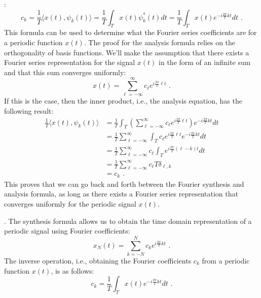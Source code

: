 :
\begin{equation}
\boxed{
c_k = \frac{1}{T}\langle x(t), \psi_k(t) \rangle = \frac{1}{T}\int_T x(t) \psi_k^*(t) dt = \frac{1}{T}\int_T x(t) e^{-i \frac{2\pi}{T} k t} dt
} \,\,.
\end{equation}
This formula can be used to determine what the Fourier series coefficients are for a periodic function $x(t)$. The proof for the analysis formula relies on the orthogonality of basis functions. We'll make the assumption that there exists a Fourier series representation for the signal $x(t)$ in the form of an infinite sum and that this sum converges uniformly:
\begin{equation}
x(t) = \sum_{\ell=-\infty}^{\infty} c_{\ell} e^{i\frac{2\pi}{T}\ell t} \,\,.
\end{equation}
If this is the case, then the inner product, i.e., the analysis
equation, has the following result:
\begin{align}
\frac{1}{T}\langle x(t), \psi_k(t) \rangle &= \frac{1}{T}\int_T \left(\sum_{\ell=-\infty}^{\infty} c_\ell e^{i\frac{2\pi}{T}\ell t}\right) e^{-i\frac{2\pi}{T}k t}dt\\
&=\frac{1}{T}\sum_{\ell=-\infty}^{\infty} \int_T c_{\ell} e^{i\frac{2\pi}{T}\ell t} e^{-i\frac{2\pi}{T}kt}dt \\
  &= \frac{1}{T}\sum_{\ell=-\infty}^{\infty}c_{\ell} \int_T e^{i\frac{2\pi}{T}(\ell-k)t}dt \\
  &= \frac{1}{T}\sum_{\ell=-\infty}^{\infty}c_{\ell} T \delta_{\ell,k}\\
  &= c_k \,\,.
\end{align}
This proves that we can go back and forth between the Fourier synthesis and analysis formula, as long as there exists a Fourier series representation that converges uniformly for the periodic signal $x(t)$.

. The synthesis formula allows us to obtain the time domain representation of a periodic signal using Fourier coefficients:
\begin{equation}
\boxed{
x_N(t) = \sum_{k=-N}^{N} c_k e^{i \frac{2\pi}{T}kt}
} \,\,.
\end{equation}
The inverse operation, i.e., obtaining the Fourier coefficients $c_k$ from a periodic function $x(t)$, is as follows:
\begin{equation}
\boxed{
c_k = \frac{1}{T} \int_T x(t) e^{-i \frac{2\pi}{T}kt} dt
} \,\,.
\end{equation}

